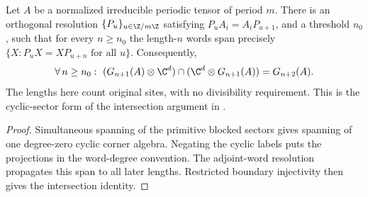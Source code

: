 \begin{lemma}
    \label{thm:periodic_original_intersection}
    \leanok
    Let $A$ be a normalized irreducible periodic tensor of period $m$.
    There is an orthogonal resolution $\{P_u\}_{u\in\Z/m\Z}$ satisfying
    $P_uA_i=A_iP_{u+1}$, and a threshold $n_0$, such that for every $n\ge n_0$
    the length-$n$ words span precisely
    $\{X:P_uX=XP_{u+n}\text{ for all }u\}$.
    Consequently,
    \begin{align}
        \forall\,n\ge n_0:\ (G_{n+1}(A)\otimes\C^d)\cap(\C^d\otimes G_{n+1}(A))=G_{n+2}(A).
        \notag
    \end{align}
    The lengths here count original sites, with no divisibility requirement.
    This is the cyclic-sector form of the intersection argument in
    \cite[equations (3.10)--(3.11)]{Nachtergaele1996Spectral}.
\end{lemma}
\begin{proof}\leanok
    Simultaneous spanning of the primitive blocked sectors gives spanning of
    one degree-zero cyclic corner algebra. Negating the cyclic labels puts the
    projections in the word-degree convention. The adjoint-word resolution
    propagates this span to all later lengths. Restricted boundary injectivity
    then gives the intersection identity.
\end{proof}

